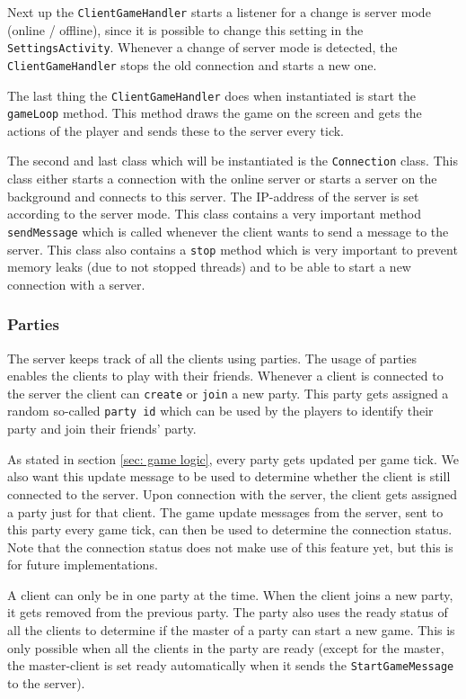 \documentclass[../main.tex]{subfiles}
\begin{document}
		Next up the \texttt{ClientGameHandler} starts a listener for a change is server mode (online / offline), since it is possible to change this setting in the \texttt{SettingsActivity}. Whenever a change of server mode is detected, the \texttt{ClientGameHandler} stops the old connection and starts a new one. 
		
		The last thing the \texttt{ClientGameHandler} does when instantiated is start the \texttt{gameLoop} method. This method draws the game on the screen and gets the actions of the player and sends these to the server every tick.

		The second and last class which will be instantiated is the \texttt{Connection} class. This class either starts a connection with the online server or starts a server on the background and connects to this server. The IP-address of the server is set according to the server mode. This class contains a very important method \texttt{sendMessage} which is called whenever the client wants to send a message to the server. This class also contains a \texttt{stop} method which is very important to prevent memory leaks (due to not stopped threads) and to be able to start a new connection with a server. 

		\subsubsection{Parties}
		The server keeps track of all the clients using parties. The usage of parties enables the clients to play with their friends. Whenever a client is connected to the server the client can \texttt{create} or \texttt{join} a new party. This party gets assigned a random so-called \texttt{party id} which can be used by the players to identify their party and join their friends' party.
		
		As stated in section \ref{sec: game logic}, every party gets updated per game tick. We also want this update message to be used to determine whether the client is still connected to the server. Upon connection with the server, the client gets assigned a party just for that client. The game update messages from the server, sent to this party every game tick, can then be used to determine the connection status. Note that the connection status does not make use of this feature yet, but this is for future implementations.

		A client can only be in one party at the time. When the client joins a new party, it gets removed from the previous party. The party also uses the ready status of all the clients to determine if the master of a party can start a new game. This is only possible when all the clients in the party are ready (except for the master, the master-client is set ready automatically when it sends the \texttt{StartGameMessage} to the server).
\end{document}
